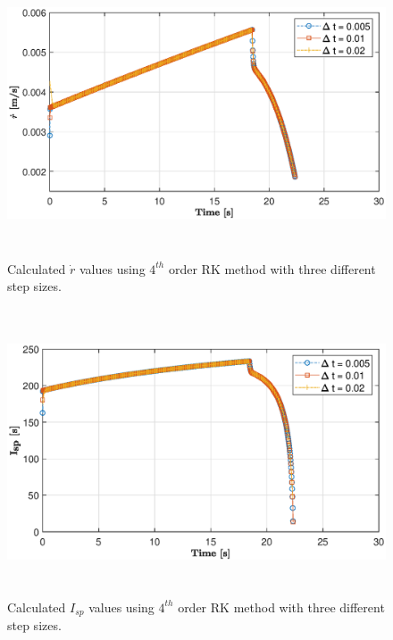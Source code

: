 \documentclass[letterpaper,12pt]{article}
\begin{document}
\begin{figure} [!h]
	\centering
	\includegraphics[height = 8.5cm]{graphs/q1_rdot.eps}
	\caption{Calculated $\dot{r}$ values using $4^{th}$ order RK method with three different step sizes.}
	\label{fig:q1rdot}
\end{figure}

\begin{figure} [!h]
	\centering
	\includegraphics[height = 8.5cm]{graphs/q1_isp.eps}
	\caption{Calculated $I_{sp}$ values using $4^{th}$ order RK method with three different step sizes.}
	\label{fig:q1Isp}
\end{figure}

\newpage
\end{document}

